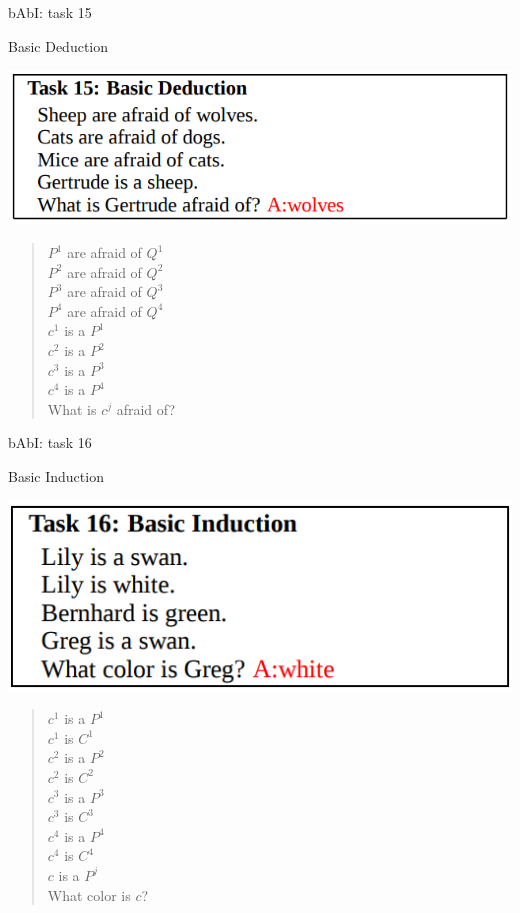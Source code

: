 \documentclass[10pt]{beamer}
\begin{document}
\begin{frame}{bAbI: task 15}

\alert{Basic Deduction}

\begin{center}
\includegraphics[scale=0.28]{images/babi15.png}
\end{center}
\begin{quote} 
\centering 
$P^{1}$ are afraid of $Q^{1}$\\
$P^{2}$ are afraid of $Q^{2}$\\
$P^{3}$ are afraid of $Q^{3}$\\
$P^{4}$ are afraid of $Q^{4}$\\
$c^{1}$ is a $P^{1}$\\
$c^{2}$ is a $P^{2}$\\
$c^{3}$ is a $P^{3}$\\
$c^{4}$ is a $P^{4}$\\
What is $c^j$ afraid of?\\
\end{quote}


\end{frame}


\begin{frame}{bAbI: task 16}

\alert{Basic Induction}

\begin{center}
\includegraphics[scale=0.28]{images/babi16.png}
\end{center}
\begin{quote} 
\centering 
$c^{1}$ is a $P^{1}$\\
$c^{1}$ is $C^{1}$\\
$c^{2}$ is a $P^{2}$\\
$c^{2}$ is $C^{2}$\\
$c^{3}$ is a $P^{3}$\\
$c^{3}$ is $C^{3}$\\
$c^{4}$ is a $P^{4}$\\
$c^{4}$ is $C^{4}$\\
$c$ is a $P^{j}$\\
What color is $c$?\\
\end{quote}

\end{frame}
\end{document}
